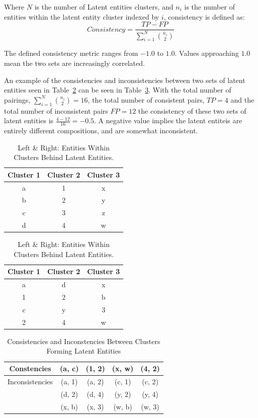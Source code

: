 \documentclass[10pt]{report}
\begin{document}
Where $N$ is the number of Latent entities clusters, and $n_i$ is the number of entities within the latent entity cluster indexed by $i$, consistency is defined as:
\[
  Consistency = \frac{TP - FP}{\sum^{N}_{i=1}{n_i\choose2}}
\]

The defined consistency metric ranges from $-1.0$ to $1.0$. Values approaching $1.0$ mean the two sets are increasingly correlated.

An example of the consistencies and inconsistencies between two sets of latent entities seen in Table~\ref{tab:latent_entity_clusters} can be seen in Table~\ref{tab:latent_entity_consistencies}. With the total number of pairings, $\sum^{N}_{i=1}{n_i\choose2} = 16$, the total number of consistent pairs, $TP=4$ and the total number of inconsistent pairs $FP=12$ the consistency of these two sets of latent entities is $\frac{4-12}{16} = -0.5$. A negative value implies the latent entiteis are entirely different compositions, and are somewhat inconsistent.

\begin{table}[h!]
  \centering
  \begin{tabular}{c | c | c}
    Cluster 1 & Cluster 2 & Cluster 3 \\
    \hline
    a & 1 & x \\
    b & 2 & y \\
    c & 3 & z \\
    d & 4 & w \\
  \end{tabular}
  \quad
  \begin{tabular}{c | c | c}
    Cluster 1 & Cluster 2 & Cluster 3 \\
    \hline
    a & d & x \\
    1 & 2 & b \\
    c & y & 3 \\
    2 & 4 & w \\
  \end{tabular}
  \caption{Left \& Right: Entities Within Clusters Behind Latent Entities.\label{tab:latent_entity_clusters}}
\end{table}

\begin{table}
  \centering
  \begin{tabular}{c | c c c c}
    Constencies
    & (a, c) 
    & (1, 2) 
    & (x, w) 
    & (4, 2)
    \\
    \hline
    Inconsistencies
         & (a, 1) 
         & (a, 2) 
         & (c, 1)                      
         & (c, 2)
         \\
         & (d, 2) 
         & (d, 4) 
         & (y, 2) 
         & (y, 4)
         \\
         & (x, b) 
         & (x, 3) 
         & (w, b) 
         & (w, 3) 
  \end{tabular}
  \caption{Consistencies and Inconstencies Between Clusters Forming Latent Entities\label{tab:latent_entity_consistencies}}
\end{table}
\end{document}
